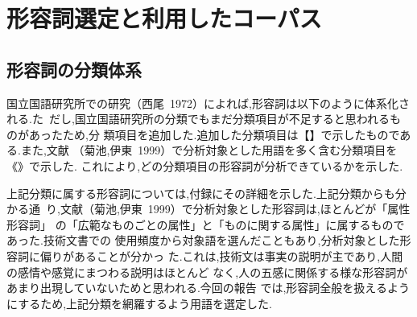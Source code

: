 \section{形容詞選定と利用したコーパス}

\subsection{形容詞の分類体系}

国立国語研究所での研究（西尾~1972）によれば,形容詞は以下のように体系化される.\mbox{た
だし,}国立国語研究所の分類でもまだ分類項目が不足すると思われるものがあったため,分
類項目を追加した.追加した分類項目は【】で示したものである.また,文献
（菊池,伊東~1999）で分析対象とした用語を多く含む分類項目を《》で示した.
これにより,どの分類項目の形容詞が分析できているかを示した.
\begin{center}
\end{center}

上記分類に属する形容詞については,付録にその詳細を示した.上記分類からも分かる\mbox{通
り,文}献（菊池,伊東~1999）で分析対象とした形容詞は,ほとんどが「属性形容詞」
の「広範なものごとの属性」と「ものに関する属性」に属するものであった.技術文書での
使用頻度から対象語を選んだこともあり,分析対象とした形容詞に偏りがあることが分かっ
た.これは,技術文は事実の説明が主であり,人間の感情や感覚にまつわる説明はほとんど
なく,人の五感に関係する様な形容詞があまり出現していないためと思われる.今回の報告
では,形容詞全般を扱えるようにするため,上記分類を網羅するよう用語を選定した.

